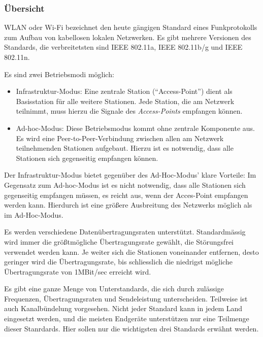         \subsubsection{Übersicht}
            WLAN oder Wi-Fi bezeichnet den heute gängigen Standard eines Funkprotokolls zum Aufbau
            von kabellosen lokalen Netzwerken. Es gibt mehrere Versionen des Standards, die verbreitetsten
            sind IEEE 802.11a, IEEE 802.11b/g und IEEE 802.11n. 

            Es sind zwei Betriebsmodi möglich:

            \begin{itemize}
                \item{Infrastruktur-Modus:} Eine zentrale Station ("`Access-Point"') dient als Basisstation
                                            für alle weitere Stationen. Jede Station, die am Netzwerk
                                            teilnimmt, muss hierzu die Signale des \textsl{Access-Points} 
                                            empfangen können.
                \item{Ad-hoc-Modus:} Diese Betriebsmodus kommt ohne zentrale Komponente aus. Es wird eine
                                     Peer-to-Peer-Verbindung zwischen allen am Netzwerk teilnehmenden 
                                     Stationen aufgebaut. Hierzu ist es notwendig, dass alle Stationen
                                     sich gegenseitig empfangen können.
            \end{itemize}

            Der Infrastruktur-Modus bietet gegenüber des Ad-Hoc-Modus' klare Vorteile: Im Gegensatz
            zum Ad-hoc-Modus ist es nicht notwendig, dass alle Stationen sich gegenseitig empfangen
            müssen, es reicht aus, wenn der Acces-Point empfangen werden kann. Hierdurch ist eine
            größere Ausbreitung des Netzwerks möglich als im Ad-Hoc-Modus. 

            Es werden verschiedene Datenübertragungsraten unterstützt. Standardmässig wird
            immer die größtmögliche Übertragungsrate gewählt, die Störungsfrei verwendet
            werden kann. Je weiter sich die Stationen voneinander entfernen, desto geringer
            wird die Übertragungsrate, bis schliesslich die niedrigst mögliche Übertragungsrate von
            1MBit/sec erreicht wird.

            Es gibt eine ganze Menge von Unterstandards, die sich durch zulässige Frequenzen, 
            Übertragungsraten und Sendeleistung unterscheiden. Teilweise ist auch Kanalbündelung 
            vorgesehen. Nicht jeder Standard kann in jedem Land eingesetzt werden, und die meisten
            Endgeräte unterstützen nur eine Teilmenge dieser Stanrdards. Hier sollen nur die
            wichtigsten drei Standards erwähnt werden.

